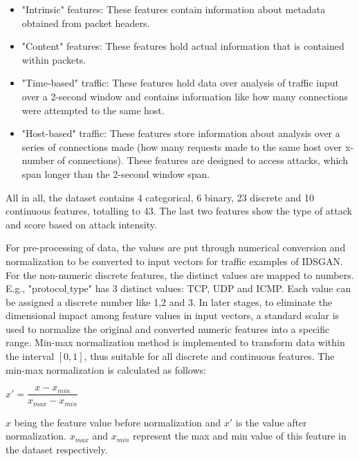 \documentclass[10pt, conference, compsocconf]{IEEEtran}
\begin{document}
\begin{itemize}

\item "Intrinsic" features: These features contain information about metadata obtained from packet headers.

\item "Content" features: These features hold actual information that is contained within packets.

\item "Time-based" traffic: These features hold data over analysis of traffic input over a 2-second window and contains information like how many connections were attempted to the same host.

\item "Host-based" traffic: These features store information about analysis over a series of connections made (how many requests made to the same host over x-number of connections). These features are designed to access attacks, which span longer than the 2-second window span.

\end{itemize}

All in all, the dataset contains 4 categorical, 6 binary, 23 discrete and 10 continuous features, totalling to 43. The last two features show the type of attack and score based on attack intensity.

For pre-processing of data, the values are put through numerical conversion and normalization to be converted to input vectors for traffic examples of IDSGAN. For the non-numeric discrete features, the distinct values are mapped to numbers. E.g., "protocol$\_$type" has 3 distinct values: TCP, UDP and ICMP. Each value can be assigned a discrete number like 1,2 and 3. In later stages, to eliminate the dimensional impact among feature values in input vectors, a standard scalar is used to normalize the original and converted numeric features into a specific range. Min-max normalization method is implemented to transform data within the interval $[0,1]$, thus suitable for all discrete and continuous features. The min-max normalization is calculated as follows:

\begin{center}

$x' = \dfrac{x - x_{min}}{x_{max} - x_{min}}$

\end{center}

$x$ being the feature value before normalization and $x'$ is the value after normalization. $x_{max}$ and $x_{min}$ represent the max and min value of this feature in the dataset respectively.
\end{document}
